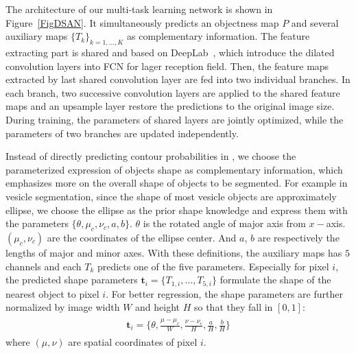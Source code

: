 The architecture of our multi-task learning network is shown in Figure~\ref{FigDSAN}.
It simultaneously predicts an objectness map $P$ and several auxiliary maps $\{T_k\}_{k=1,\ldots,K}$ as complementary information.
The feature extracting part is shared and based on DeepLab~\cite{Chen2014a}, which introduce the dilated convolution layers into FCN for lager reception field.
Then, the feature maps extracted by last shared convolution layer are fed into two individual branches.
In each branch, two successive convolution layers are applied to the shared feature maps and an upsample layer restore the predictions to the original image size.
During training, the parameters of shared layers are jointly optimized, while the parameters of two branches are updated independently.

Instead of directly predicting contour probabilities in \cite{Chen2017,Chen2016,Bertasius2016}, we choose the parameterized expression of objects shape as complementary information, which emphasizes more on the overall shape of objects to be segmented.
For example in vesicle segmentation, since the shape of most vesicle objects are approximately ellipse, we choose the ellipse as the prior shape knowledge and express them with the parameters $\{\theta, \mu_c, \nu_c, a, b\}$.
$\theta$ is the rotated angle of major axis from $x-$axis.
$(\mu_c, \nu_c)$ are the coordinates of the ellipse center.
And $a$, $b$ are respectively the lengths of major and minor axes.
With these definitions, the auxiliary maps has $5$ channels and each $T_k$ predicts one of the five parameters.
Especially for pixel $i$, the predicted shape parameters $\mathbf{t}_i= \{T_{1,i},\ldots,T_{5,i}\}$ formulate the shape of the nearest object to pixel $i$.
For better regression, the shape parameters are further normalized by image width $W$ and height $H$ so that they fall in $[0,1]$:
\begin{eqnarray}\label{EqPara}
\begin{aligned}
\mathbf{t}_{i} = \{\theta,\frac{\mu-\mu_c}{W},\frac{\nu-\nu_c}{H},\frac{a}{H},\frac{b}{H}\}
\end{aligned}
\end{eqnarray}
where $(\mu, \nu)$ are spatial coordinates of pixel $i$.

